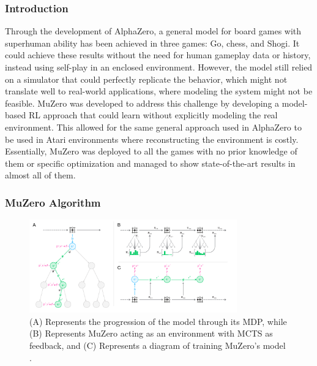 \subsubsection{Introduction}
Through the development of AlphaZero, a general model for board games with
superhuman ability has been achieved in three games: Go, chess, and Shogi. It
could achieve these results without the need for human gameplay data or
history, instead using self-play in an enclosed environment. However, the model
still relied on a simulator that could perfectly replicate the behavior, which
might not translate well to real-world applications, where modeling the system
might not be feasible. MuZero was developed to address this challenge by
developing a model-based RL approach that could learn without explicitly
modeling the real environment. This allowed for the same general approach used
in AlphaZero to be used in Atari environments where reconstructing the
environment is costly. Essentially, MuZero was deployed to all the games with
no prior knowledge of them or specific optimization and managed to show
state-of-the-art results in almost all of them.

\subsubsection{MuZero Algorithm}
\begin{figure}[t]
    \centering
    \includegraphics[width=0.8\textwidth]{graph_1.png}
    \caption{(A) Represents the progression of the model through its MDP, while (B) Represents MuZero acting as an environment with MCTS as feedback, and (C) Represents a diagram of training MuZero's model \cite{mz1}.}
    \label{fig:muzero_model}
\end{figure}

